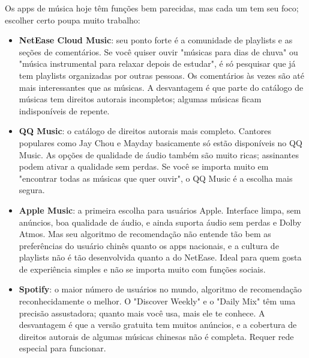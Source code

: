 


Os apps de música hoje têm funções bem parecidas, mas cada um tem seu foco; escolher certo poupa muito trabalho:

\begin{itemize}
  \item \textbf{NetEase Cloud Music}: seu ponto forte é a comunidade de playlists e as seções de comentários. Se você quiser ouvir "músicas para dias de chuva" ou "música instrumental para relaxar depois de estudar", é só pesquisar que já tem playlists organizadas por outras pessoas. Os comentários às vezes são até mais interessantes que as músicas. A desvantagem é que parte do catálogo de músicas tem direitos autorais incompletos; algumas músicas ficam indisponíveis de repente.
  \item \textbf{QQ Music}: o catálogo de direitos autorais mais completo. Cantores populares como Jay Chou e Mayday basicamente só estão disponíveis no QQ Music. As opções de qualidade de áudio também são muito ricas; assinantes podem ativar a qualidade sem perdas. Se você se importa muito em "encontrar todas as músicas que quer ouvir", o QQ Music é a escolha mais segura.
  \item \textbf{Apple Music}: a primeira escolha para usuários Apple. Interface limpa, sem anúncios, boa qualidade de áudio, e ainda suporta áudio sem perdas e Dolby Atmos. Mas seu algoritmo de recomendação não entende tão bem as preferências do usuário chinês quanto os apps nacionais, e a cultura de playlists não é tão desenvolvida quanto a do NetEase. Ideal para quem gosta de experiência simples e não se importa muito com funções sociais.
  \item \textbf{Spotify}: o maior número de usuários no mundo, algoritmo de recomendação reconhecidamente o melhor. O "Discover Weekly" e o "Daily Mix" têm uma precisão assustadora; quanto mais você usa, mais ele te conhece. A desvantagem é que a versão gratuita tem muitos anúncios, e a cobertura de direitos autorais de algumas músicas chinesas não é completa. Requer rede especial para funcionar.
\end{itemize}

